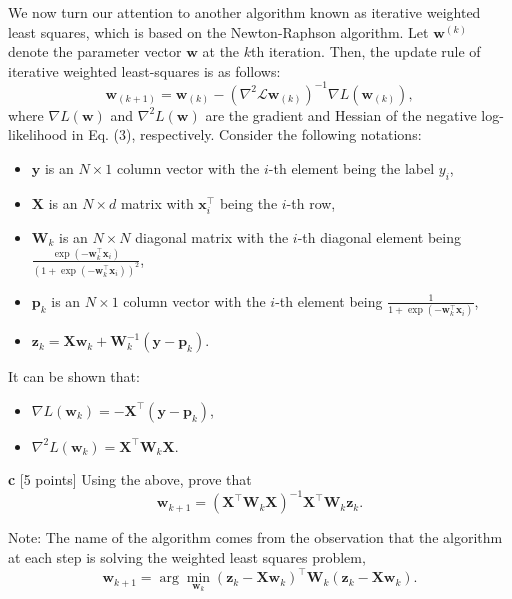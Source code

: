 \documentclass[a3paper,12pt]{extarticle} %
\begin{document}
We now turn our attention to another algorithm known as iterative weighted least squares, which is based on the Newton-Raphson algorithm. Let $\mathbf{w}^{(k)}$ denote the parameter vector $\mathbf{w}$ at the $k$th iteration. Then, the update rule of iterative weighted least-squares is as follows:
\[
\mathbf{w}_{(k+1)} = \mathbf{w}_{(k)} - \left( \nabla^2\mathcal{L}\mathbf{w}_{(k)} \right)^{-1} \nabla L(\mathbf{w}_{(k)}),
\]
where \( \nabla L(\mathbf{w}) \) and \( \nabla^2 L(\mathbf{w}) \) are the gradient and Hessian of the negative log-likelihood in Eq. (3), respectively. Consider the following notations:
\begin{itemize}
    \item \( \mathbf{y} \) is an \( N \times 1 \) column vector with the \( i \)-th element being the label \( y_i \),
    \item \( \mathbf{X} \) is an \( N \times d \) matrix with \( \mathbf{x}_i^\top \) being the \( i \)-th row,
    \item \( \mathbf{W}_k \) is an \( N \times N \) diagonal matrix with the \( i \)-th diagonal element being \( \frac{\exp(-\mathbf{w}_k^\top \mathbf{x}_i)}{(1 + \exp(-\mathbf{w}_k^\top \mathbf{x}_i))^2} \),
    \item \( \mathbf{p}_k \) is an \( N \times 1 \) column vector with the \( i \)-th element being \( \frac{1}{1 + \exp(-\mathbf{w}_k^\top \mathbf{x}_i)} \),
    \item \( \mathbf{z}_k = \mathbf{X} \mathbf{w}_k + \mathbf{W}_k^{-1} (\mathbf{y} - \mathbf{p}_k) \).
\end{itemize}

It can be shown that:
\begin{itemize}
    \item \( \nabla L(\mathbf{w}_k) = -\mathbf{X}^\top (\mathbf{y} - \mathbf{p}_k) \),
    \item \( \nabla^2 L(\mathbf{w}_k) = \mathbf{X}^\top \mathbf{W}_k \mathbf{X} \).
\end{itemize}

\textbf{ c }[5 points] Using the above, prove that
\[
\mathbf{w}_{k+1} = (\mathbf{X}^\top \mathbf{W}_k \mathbf{X})^{-1} \mathbf{X}^\top \mathbf{W}_k \mathbf{z}_k.
\]

Note: The name of the algorithm comes from the observation that the algorithm at each step is solving the weighted least squares problem,
\[
\mathbf{w}_{k+1} = \arg\min_{\mathbf{w}_k} (\mathbf{z}_k - \mathbf{X} \mathbf{w}_k)^\top \mathbf{W}_k (\mathbf{z}_k - \mathbf{X} \mathbf{w}_k).
\]
\end{document}
